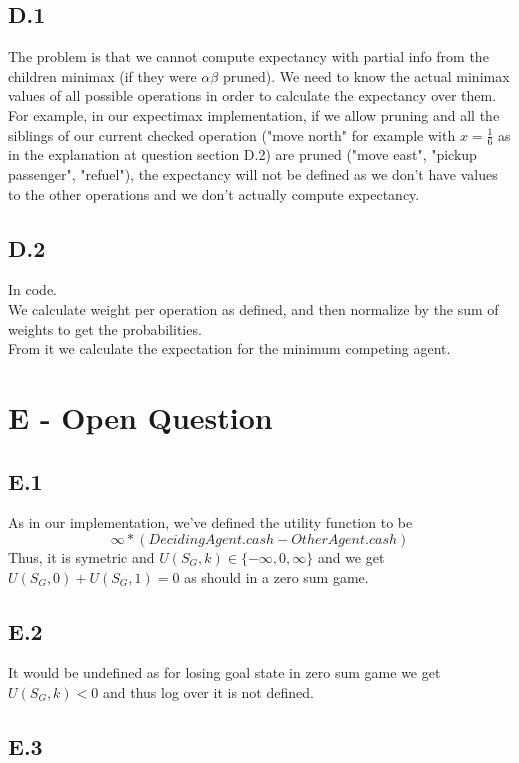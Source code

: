 \documentclass[12pt]{article}
\begin{document}
\subsection*{D.1}

The problem is that we cannot compute expectancy with partial info from the children minimax (if they were $\alpha\beta$ pruned). We need to know the actual minimax values of all possible operations in order to calculate the expectancy over them.\\
For example, in our expectimax implementation, if we allow pruning and all the siblings of our current checked operation ("move north" for example with $x=\frac{1}{6}$ as in the explanation at question section D.2) are pruned ("move east", "pickup passenger", "refuel"), the expectancy will not be defined as we don't have values to the other operations and we don't actually compute expectancy.\\

\subsection*{D.2}
In code.\\
We calculate weight per operation as defined, and then normalize by the sum of weights to get the probabilities.\\
From it we calculate the expectation for the minimum competing agent.

\section*{E - Open Question}

\subsection*{E.1}

As in our implementation, we've defined the utility function to be $$\infty *(DecidingAgent.cash - OtherAgent.cash)$$
Thus, it is symetric and $U(S_G,k)\in \{-\infty,0,\infty\}$ and we get $U(S_G,0) + U(S_G,1) = 0$ as should in a zero sum game. 

\subsection*{E.2}

It would be undefined as for losing goal state in zero sum game we get $U(S_G,k)<0$ and thus log over it is not defined.

\subsection*{E.3}
\end{document}
